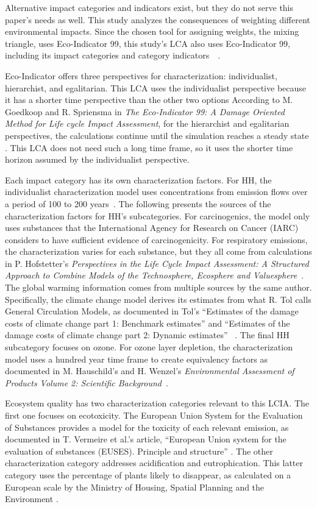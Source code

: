 \documentclass[final,journal,10pt,letterpaper,oneside,twocolumn,compsoc]%
{IEEEtran}
\begin{document}
Alternative impact categories and indicators exist, but they do not serve this
paper's needs as well. This study analyzes the consequences of weighting
different environmental
impacts. Since the chosen tool for assigning weights, the mixing triangle, uses
Eco-Indicator 99, this study's LCA also uses Eco-Indicator 99, including its
impact categories and category indicators~\cite{triangle}~\cite{pre}.

Eco-Indicator offers three perspectives for characterization: individualist,
hierarchist, and egalitarian. This LCA uses
the individualist perspective because it has a shorter time
perspective than the other two options
According to M. Goedkoop and R. Spriensma in
\textit{The Eco-Indicator 99: A Damage Oriented Method for Life cycle Impact
Assessment}, for the hierarchist and egalitarian
perspectives, the calculations continue until the simulation reaches a steady
state \cite{pre-annex}. This LCA does not need such a long time frame, so it
uses the shorter time horizon assumed by the individualist perspective.

Each impact category has its own characterization factors. For HH, the individualist
characterization model uses concentrations from emission flows
over a period of 100 to 200 years~\cite{pre-annex}. The following presents the
sources of the characterization factors for HH's subcategories. For
carcinogenics, the model only uses
substances that the International Agency for Research on Cancer (IARC) considers
to have sufficient evidence of carcinogenicity. For respiratory emissions, the
characterization varies for each substance, but they all come from calculations
in P. Hofstetter's
\textit{Perspectives in the Life Cycle Impact Assessment: A Structured Approach
to Combine Models of the Technosphere, Ecosphere and Valuesphere}~\cite{lcia}.
The global warming information comes from multiple sources by the same author.
Specifically, the climate change model derives its estimates from what R. Tol
calls General Circulation Models, as documented in Tol's
``Estimates of the damage costs of climate change part 1: Benchmark estimates''
and ``Estimates of the damage costs of climate change part 2: Dynamic
estimates''~\cite{climate1}
\cite{climate2}. The final HH subcategory focuses on ozone.
For ozone
layer depletion, the characterization model uses a
hundred year time frame to create equivalency factors as documented in
M. Hauschild's and H. Wenzel's \textit{Environmental Assessment of Products
Volume 2: Scientific Background}~\cite{ozone}.

Ecosystem quality has two characterization categories relevant to this LCIA. The
first one focuses on ecotoxicity. The European Union System for the Evaluation
of Substances provides a model for the toxicity of each relevant emission, as
documented in T. Vermeire et al.'s article, ``European Union system for the
evaluation of substances (EUSES). Principle and structure''
\cite{euses}. The other characterization category addresses acidification and
eutrophication. This
latter category uses the percentage of plants likely to disappear, as calculated
on
a
European scale by the Ministry of Housing, Spatial Planning and the Environment
\cite{pre}.
\end{document}
